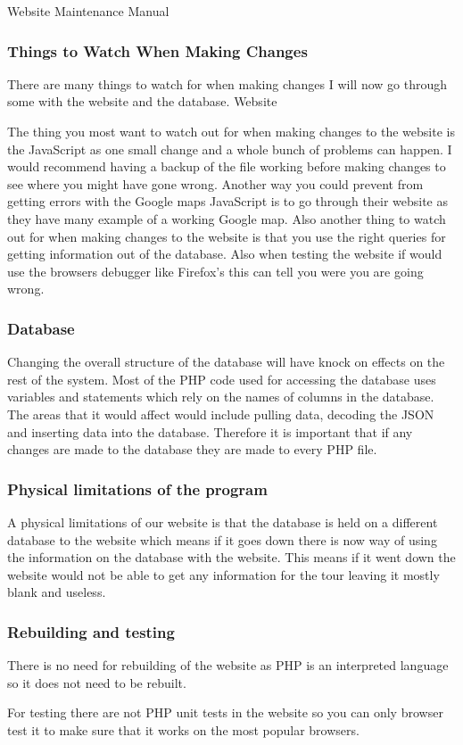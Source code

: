 \documentclass{article}
\begin{document}
\begin{section}{Website Maintenance Manual}
		\subsubsection{Things to Watch When Making Changes}
		There are many things to watch for when making changes I will now go through some with the website and the database.
		Website

		The thing you most want to watch out for when making changes to the website is the JavaScript as one small change and a whole bunch of problems can happen. I would recommend having a backup of the file working before making changes to see where you might have gone wrong. Another way you could prevent from getting errors with the Google maps JavaScript is to go through their website as they have many example of a working Google map. Also another thing to watch out for when making changes to the website is that you use the right queries for getting information out of the database. Also when testing the website if would use the browsers debugger like Firefox’s this can tell you were you are going wrong.

		\subsubsection{Database}
		Changing the overall structure of the database will have knock on effects on the rest of the system. Most of the PHP code used for accessing the database uses variables and statements which rely on the names of columns in the database. The areas that it would affect would include pulling data, decoding the JSON and inserting data into the database. Therefore it is important that if any changes are made to the database they are made to every PHP file. 

		\subsubsection{Physical limitations of the program}
		A physical limitations of our website is that the database is held on a different database to the website which means if it goes down there is now way of using the information on the database with the website. This means if it went down the website would not be able to get any information for the tour leaving it mostly blank and useless.


		\subsubsection{Rebuilding and testing}
			There is no need for rebuilding of the website as PHP is an interpreted language so it does not need to be rebuilt.
	
			For testing there are not PHP unit tests in the website so you can only browser test it to make sure that it works on the most popular browsers.
	\end{section}
	
\end{document}
